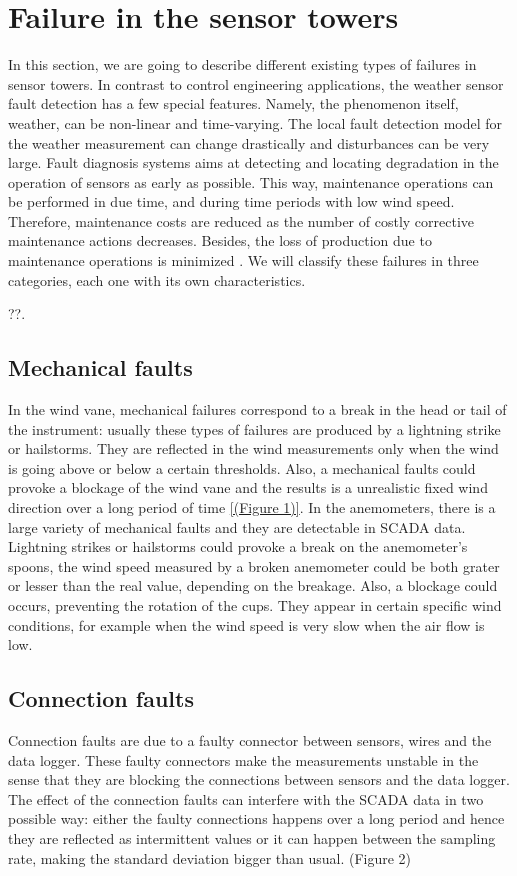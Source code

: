 \documentclass[journal]{IEEEtran}
\begin{document}
\section{Failure in the sensor towers}\label{sec:failures}
In this section, we are going to describe different existing types of failures in sensor towers. In contrast to control engineering applications, the weather sensor fault detection has a few special features. Namely, the phenomenon itself, weather, can be non-linear and time-varying. The local fault detection model for the weather measurement can change drastically and disturbances can be very large. Fault diagnosis systems aims at detecting and locating degradation in the operation of sensors as early as possible. This way, maintenance operations can be performed in due time, and during time periods with low wind speed. Therefore, maintenance costs are reduced as the number of costly corrective maintenance actions decreases. Besides, the loss of production due to maintenance operations is minimized \cite{luo2014wind}. We will classify these failures in three categories, each one with its own characteristics.


??\cite{chandola2009anomaly}.


\subsection{Mechanical faults}
In the wind vane, mechanical failures correspond to a break in the head or tail of the instrument: usually these types of failures are produced by a lightning strike or hailstorms. They are reflected in the wind measurements only when the wind is going above or below a certain thresholds. Also, a mechanical faults could provoke a blockage of the wind vane and the results is a unrealistic fixed wind direction over a long period of time \ref{(Figure 1)}.
In the anemometers, there is a large variety of mechanical faults and they are detectable in SCADA data. Lightning strikes or hailstorms could provoke a break on the anemometer's spoons, the wind speed measured by a broken anemometer could be both grater or lesser than the real value, depending on the breakage. Also, a blockage could occurs, preventing the rotation of the cups. They appear in certain specific wind conditions, for example when the wind speed is very slow when the air flow is low.

\subsection{Connection  faults}
Connection faults are due to a faulty connector between sensors, wires and the data logger. These faulty connectors make the measurements unstable in the sense that they are blocking the connections between sensors and the data logger. The effect of the connection faults can interfere with the SCADA data in two possible way: either the faulty connections happens over a long period and hence they are reflected as intermittent values or it can happen between the sampling rate, making the standard deviation bigger than usual. (Figure 2) 
\end{document}
